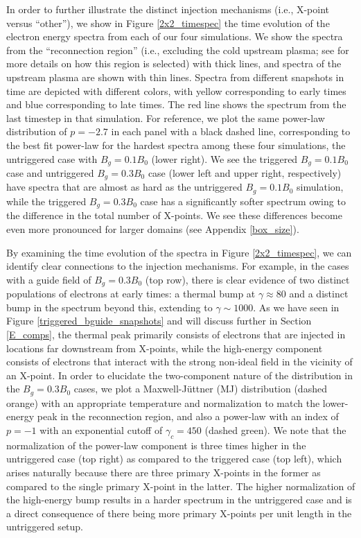 In order to further illustrate the distinct injection mechanisms (i.e., X-point versus ``other''), we show in Figure \ref{2x2_timespec} the time evolution of the electron energy spectra from each of our four simulations.  We show the spectra from the ``reconnection region'' (i.e., excluding the cold upstream plasma; see \citealt{ball2018} for more details on how this region is selected) with thick lines, and spectra of the upstream plasma are shown with thin lines.  Spectra from different snapshots in time are depicted with different colors, with yellow corresponding to early times and blue corresponding to late times.  The red line shows the spectrum from the last timestep in that simulation.  For reference, we plot the same power-law distribution of $p=-2.7$ in each panel with a black dashed line, corresponding to the best fit power-law for the hardest spectra among these four simulations, the untriggered case with $B_{g}=0.1B_{0}$ (lower right).  We see the triggered $B_{g}=0.1B_{0}$ case and untriggered $B_{g}=0.3B_{0}$ case (lower left and upper right, respectively) have spectra that are almost as hard as the untriggered $B_{g}=0.1B_{0}$ simulation, while the triggered $B_{g}=0.3B_{0}$ case has a significantly softer spectrum owing to the difference in the total number of X-points.  We see these differences become even more pronounced for larger domains (see Appendix \ref{box_size}).  

By examining the time evolution of the spectra in Figure \ref{2x2_timespec}, we can identify clear connections to the injection mechanisms.  For example, in the cases with a guide field of $B_{g}=0.3B_{0}$ (top row), there is clear evidence of two distinct populations of electrons at early times: a thermal bump at $\gamma\approx 80$ and a distinct bump in the spectrum beyond this, extending to $\gamma \sim 1000$.  As we have seen in Figure \ref{triggered_bguide_snapshots} and will discuss further in Section \ref{E_comps}, the thermal peak primarily consists of electrons that are injected in locations far downstream from X-points, while the high-energy component consists of electrons that interact with the strong non-ideal field in the vicinity of an X-point.  In order to elucidate the two-component nature of the distribution in the $B_{g}=0.3B_{0}$ cases, we plot a Maxwell-J\"uttner (MJ) distribution (dashed orange) with an appropriate temperature and normalization to match the lower-energy peak in the reconnection region, and also a power-law with an index of $p=-1$ with an exponential cutoff of $\gamma_{c}=450$ (dashed green).  We note that the normalization of the power-law component is three times higher in the untriggered case (top right) as compared to the triggered case (top left), which arises naturally because there are three primary X-points in the former as compared to the single primary X-point in the latter.  The higher normalization of the high-energy bump results in a harder spectrum in the untriggered case and is a direct consequence of there being more primary X-points per unit length in the untriggered setup.

